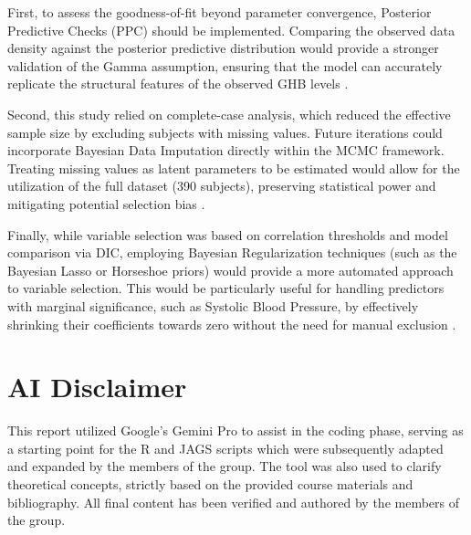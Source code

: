 First, to assess the goodness-of-fit beyond parameter convergence, Posterior Predictive Checks (PPC) should be implemented. Comparing the observed data density against the posterior predictive distribution would provide a stronger validation of the Gamma assumption, ensuring that the model can accurately replicate the structural features of the observed GHB levels \cite{gelman2013}.

Second, this study relied on complete-case analysis, which reduced the effective sample size by excluding subjects with missing values. Future iterations could incorporate Bayesian Data Imputation directly within the MCMC framework. Treating missing values as latent parameters to be estimated would allow for the utilization of the full dataset (390 subjects), preserving statistical power and mitigating potential selection bias \cite{rubin2019}.

Finally, while variable selection was based on correlation thresholds and model comparison via DIC, employing Bayesian Regularization techniques (such as the Bayesian Lasso or Horseshoe priors) would provide a more automated approach to variable selection. This would be particularly useful for handling predictors with marginal significance, such as Systolic Blood Pressure, by effectively shrinking their coefficients towards zero without the need for manual exclusion \cite{park2008}.

\section*{AI Disclaimer}
This report utilized Google's Gemini Pro to assist in the coding phase, serving as a starting point for the R and JAGS scripts which were subsequently adapted and expanded by the members of the group. The tool was also used to clarify theoretical concepts, strictly based on the provided course materials and bibliography. All final content has been verified and authored by the members of the group.